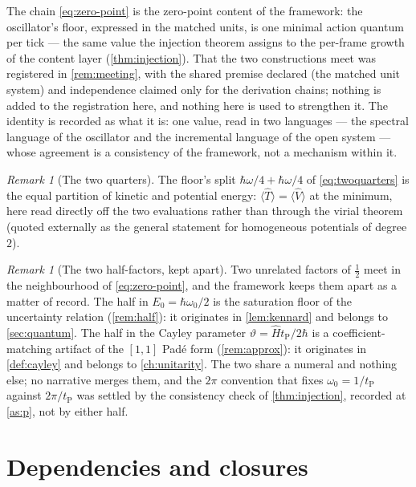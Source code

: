 \documentclass[11pt]{amsbook}
\theoremstyle{plain}
\theoremstyle{definition}
\theoremstyle{remark}
\newtheorem{remark}[theorem]{Remark}
\begin{document}
The chain \cref{eq:zero-point} is the zero-point content of the framework: the oscillator's floor, expressed in the matched units, is one minimal action quantum per tick --- the same value the injection theorem assigns to the per-frame growth of the content layer (\cref{thm:injection}). That the two constructions meet was registered in \cref{rem:meeting}, with the shared premise declared (the matched unit system) and independence claimed only for the derivation chains; nothing is added to the registration here, and nothing here is used to strengthen it. The identity is recorded as what it is: one value, read in two languages --- the spectral language of the oscillator and the incremental language of the open system --- whose agreement is a consistency of the framework, not a mechanism within it.

\begin{remark}[The two quarters]\label{rem:two-quarters}
The floor's split $\hbar\omega/4 + \hbar\omega/4$ of \cref{eq:twoquarters} is the equal partition of kinetic and potential energy: $\langle \hat T\rangle = \langle \hat V\rangle$ at the minimum, here read directly off the two evaluations rather than through the virial theorem (quoted externally as the general statement for homogeneous potentials of degree $2$).
\end{remark}

\begin{remark}[The two half-factors, kept apart]\label{rem:two-halves}
Two unrelated factors of $\tfrac12$ meet in the neighbourhood of \cref{eq:zero-point}, and the framework keeps them apart as a matter of record. The half in $E_{0} = \hbar\omega_{0}/2$ is the saturation floor of the uncertainty relation (\cref{rem:half}): it originates in \cref{lem:kennard} and belongs to \cref{sec:quantum}. The half in the Cayley parameter $\vartheta = \hat H t_{\mathrm P}/2\hbar$ is a coefficient-matching artifact of the $[1,1]$ Pad\'e form (\cref{rem:approx}): it originates in \cref{def:cayley} and belongs to \cref{ch:unitarity}. The two share a numeral and nothing else; no narrative merges them, and the $2\pi$ convention that fixes $\omega_{0} = 1/t_{\mathrm P}$ against $2\pi/t_{\mathrm P}$ was settled by the consistency check of \cref{thm:injection}, recorded at \cref{as:p}, not by either half.
\end{remark}

\section{Dependencies and closures}\label{sec:lattice-backfill}
\end{document}
